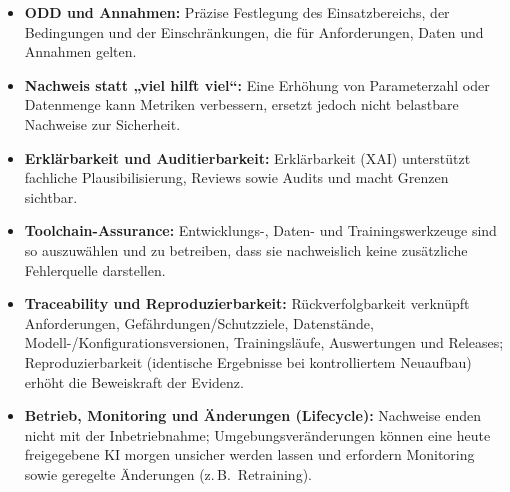 \medskip
\begin{itemize}
  \item \textbf{ODD und Annahmen:} Präzise Festlegung des Einsatzbereichs, der Bedingungen und der
        Einschränkungen, die für Anforderungen, Daten und Annahmen gelten.
  \item \textbf{Nachweis statt „viel hilft viel“:} Eine Erhöhung von Parameterzahl oder Datenmenge
        kann Metriken verbessern, ersetzt jedoch nicht belastbare Nachweise
        zur Sicherheit.
  \item \textbf{Erklärbarkeit und Auditierbarkeit:} Erklärbarkeit (XAI) unterstützt fachliche
        Plausibilisierung, Reviews sowie Audits und macht Grenzen sichtbar.
  \item \textbf{Toolchain-Assurance:} Entwicklungs-, Daten- und Trainingswerkzeuge sind so auszuwählen
        und zu betreiben, dass sie nachweislich keine zusätzliche Fehlerquelle darstellen.
  \item \textbf{Traceability und Reproduzierbarkeit:} Rückverfolgbarkeit verknüpft Anforderungen,
        Gefährdungen/Schutzziele, Datenstände, Modell-/Konfigurationsversionen, Trainingsläufe,
        Auswertungen und Releases; Reproduzierbarkeit (identische Ergebnisse bei kontrolliertem Neuaufbau)
        erhöht die Beweiskraft der Evidenz.
  \item \textbf{Betrieb, Monitoring und Änderungen (Lifecycle):} Nachweise enden nicht mit der
        Inbetriebnahme; Umgebungsveränderungen können eine heute freigegebene KI morgen unsicher
        werden lassen und erfordern Monitoring sowie geregelte Änderungen (z.\,B.\ Retraining).
\end{itemize}

